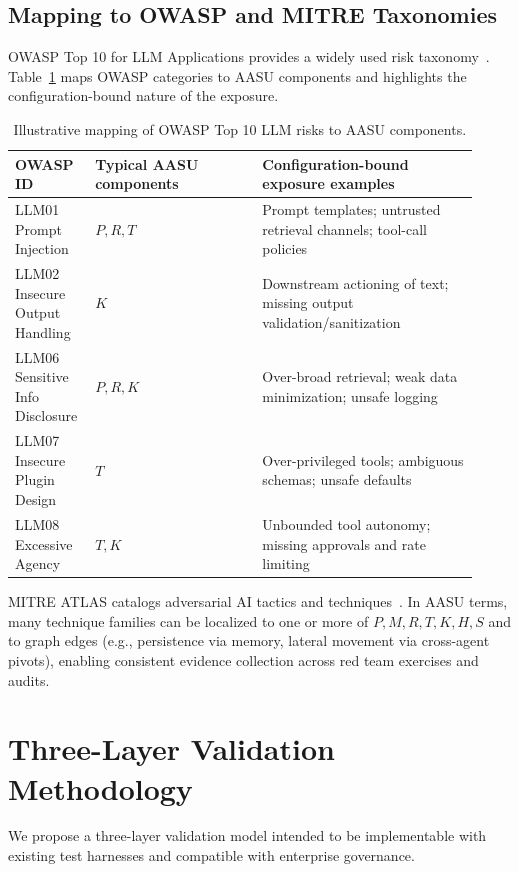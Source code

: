 \documentclass[11pt]{article}
\newcommand{\AASU}{\textsc{AASU}}
\begin{document}
\subsection{Mapping to OWASP and MITRE Taxonomies}
OWASP Top 10 for LLM Applications provides a widely used risk taxonomy~\cite{owasp_llm_top10}.
Table~\ref{tab:owasp} maps OWASP categories to \AASU{} components and highlights the configuration-bound nature of the exposure.

\begin{table}[t]
  \centering
  \small
  \begin{tabular}{@{}p{0.14\linewidth}p{0.34\linewidth}p{0.44\linewidth}@{}}
    \toprule
    \textbf{OWASP ID} & \textbf{Typical \AASU{} components} & \textbf{Configuration-bound exposure examples} \\
    \midrule
    LLM01 Prompt Injection & $P,R,T$ & Prompt templates; untrusted retrieval channels; tool-call policies \\
    LLM02 Insecure Output Handling & $K$ & Downstream actioning of text; missing output validation/sanitization \\
    LLM06 Sensitive Info Disclosure & $P,R,K$ & Over-broad retrieval; weak data minimization; unsafe logging \\
    LLM07 Insecure Plugin Design & $T$ & Over-privileged tools; ambiguous schemas; unsafe defaults \\
    LLM08 Excessive Agency & $T,K$ & Unbounded tool autonomy; missing approvals and rate limiting \\
    \bottomrule
  \end{tabular}
  \caption{Illustrative mapping of OWASP Top 10 LLM risks to \AASU{} components.}
  \label{tab:owasp}
\end{table}

MITRE ATLAS catalogs adversarial AI tactics and techniques~\cite{mitre_atlas}.
In \AASU{} terms, many technique families can be localized to one or more of $P,M,R,T,K,H,S$ and to graph edges (e.g., persistence via memory, lateral movement via cross-agent pivots),
enabling consistent evidence collection across red team exercises and audits.

\section{Three-Layer Validation Methodology}
We propose a three-layer validation model intended to be implementable with existing test harnesses and compatible with enterprise governance.
\end{document}
